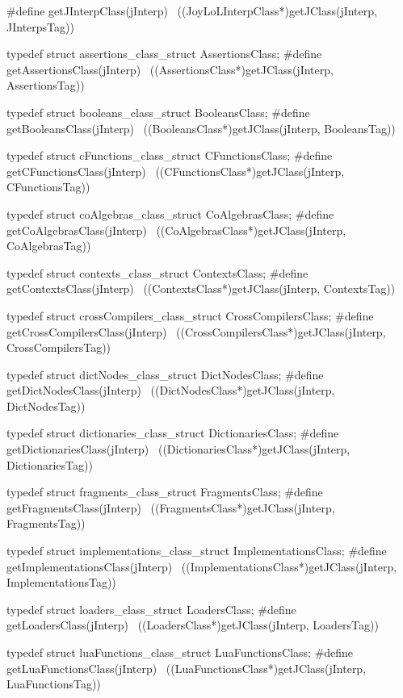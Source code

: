#define getJInterpClass(jInterp)                            \
  ((JoyLoLInterpClass*)getJClass(jInterp, JInterpsTag))

typedef struct assertions_class_struct AssertionsClass;
#define getAssertionsClass(jInterp)                         \
  ((AssertionsClass*)getJClass(jInterp, AssertionsTag))

typedef struct booleans_class_struct BooleansClass;
#define getBooleansClass(jInterp)                           \
  ((BooleansClass*)getJClass(jInterp, BooleansTag))

typedef struct cFunctions_class_struct CFunctionsClass;
#define getCFunctionsClass(jInterp)                         \
  ((CFunctionsClass*)getJClass(jInterp, CFunctionsTag))

typedef struct coAlgebras_class_struct CoAlgebrasClass;
#define getCoAlgebrasClass(jInterp)                         \
  ((CoAlgebrasClass*)getJClass(jInterp, CoAlgebrasTag))

typedef struct contexts_class_struct ContextsClass;
#define getContextsClass(jInterp)                           \
  ((ContextsClass*)getJClass(jInterp, ContextsTag))

typedef struct crossCompilers_class_struct CrossCompilersClass;
#define getCrossCompilersClass(jInterp)                     \
  ((CrossCompilersClass*)getJClass(jInterp, CrossCompilersTag))

typedef struct dictNodes_class_struct DictNodesClass;
#define getDictNodesClass(jInterp)                          \
  ((DictNodesClass*)getJClass(jInterp, DictNodesTag))

typedef struct dictionaries_class_struct DictionariesClass;
#define getDictionariesClass(jInterp)                       \
  ((DictionariesClass*)getJClass(jInterp, DictionariesTag))

typedef struct fragments_class_struct FragmentsClass;
#define getFragmentsClass(jInterp)                          \
  ((FragmentsClass*)getJClass(jInterp, FragmentsTag))

typedef struct implementations_class_struct ImplementationsClass;
#define getImplementationsClass(jInterp)                          \
  ((ImplementationsClass*)getJClass(jInterp, ImplementationsTag))

typedef struct loaders_class_struct LoadersClass;
#define getLoadersClass(jInterp)                            \
  ((LoadersClass*)getJClass(jInterp, LoadersTag))

typedef struct luaFunctions_class_struct LuaFunctionsClass;
#define getLuaFunctionsClass(jInterp)                       \
  ((LuaFunctionsClass*)getJClass(jInterp, LuaFunctionsTag))

